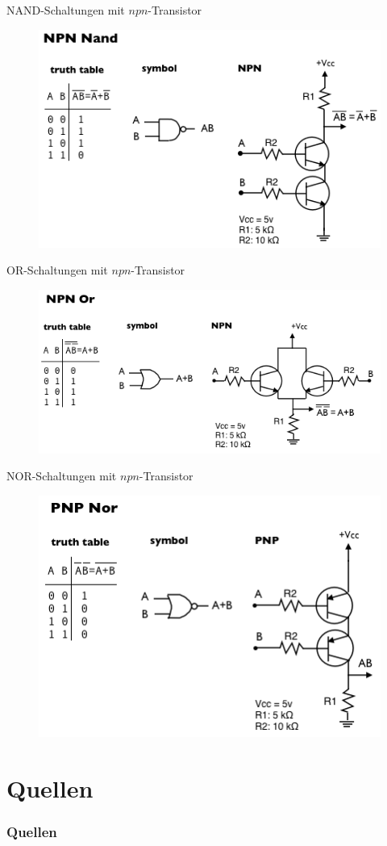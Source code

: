 \documentclass[12pt%
,aspectratio=169%
]{beamer}
\begin{document}
\begin{frame}{NAND-Schaltungen mit $npn$-Transistor}
\begin{figure}
\center
\includegraphics[scale=0.65]{pictures/nand}
\end{figure}
\end{frame}


\begin{frame}{OR-Schaltungen mit $npn$-Transistor}
\begin{figure}
\center
\includegraphics[scale=0.6]{pictures/or}
\end{figure}
\end{frame}

\begin{frame}{NOR-Schaltungen mit $npn$-Transistor}
\begin{figure}
\center
\includegraphics[scale=0.65]{pictures/nor}
\end{figure}
\end{frame}

\section*{Quellen}
\appendix
\begin{frame}[allowframebreaks]
  \frametitle<presentation>{Quellen}
\printbibliography
\end{frame}
\end{document}
